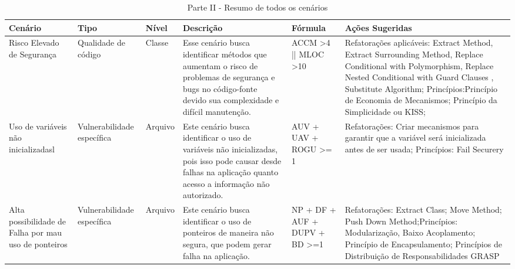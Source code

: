 \begin{landscape}
	\begin{table}[H]
		\begin{center}
	    \begin{tabular}{ |p{}| p{3cm} | p{2cm} | p{5cm} | p{3.5cm}  | p{6.5cm}  |}
	    \hline
Cenário                                              & Tipo                       & Nível   & Descrição                                                                                                                                                       & Fórmula                                     & Ações Sugeridas                                                                                                                                                                                                                                                      \\ \hline
Risco Elevado de Segurança                           & Qualidade de código        & Classe  & Esse cenário busca identificar métodos que aumentam o risco de problemas de segurança e bugs no código-fonte devido sua complexidade e difícil manutenção.      & ACCM \textgreater 4 || MLOC \textgreater 10 & Refatorações aplicáveis: Extract Method, Extract Surrounding Method, Replace Conditional with Polymorphism, Replace Nested Conditional with Guard Clauses , Substitute Algorithm; Princípios:Princípio de Economia de Mecanismos; Princípio da Simplicidade ou KISS; \\ \hline
Uso de variáveis não inicializadasl                  & Vulnerabilidade específica & Arquivo & Este cenário busca identificar o uso de variáveis não inicializadas, pois isso pode causar desde falhas na aplicação quanto acesso a informação não autorizado. & AUV + UAV + ROGU \textgreater= 1            & Refatorações: Criar mecanismos para garantir que a variável será inicializada antes de ser usada; Princípios: Fail Securery                                                                                                                                          \\ \hline
Alta possibilidade de Falha por mau uso de ponteiros & Vulnerabilidade específica & Arquivo & Este cenário busca identificar o uso de ponteiros de maneira não segura, que podem gerar falha na aplicação.                                                    & NP + DF + AUF + DUPV + BD \textgreater=1    & Refatorações: Extract Class; Move Method; Push Down Method;Princípios: Modularização, Baixo Acoplamento; Princípio de Encapsulamento; Princípios de Distribuição de Responsabilidades GRASP                                                                          \\ \hline
\end{tabular}
		    \caption{Parte II - Resumo de todos os cenários}
		    \label{tab:resumo2}
		\end{center}
	\end{table}


\end{landscape}
